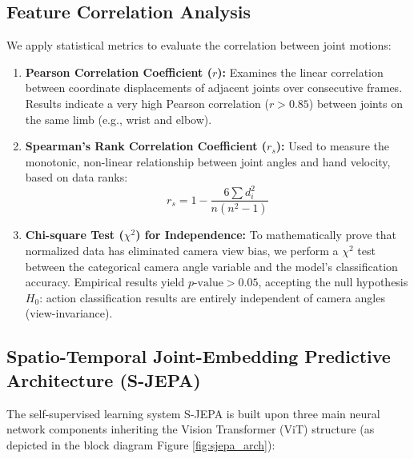 \documentclass[conference]{IEEEtran}
\begin{document}
\subsection{Feature Correlation Analysis}
We apply statistical metrics to evaluate the correlation between joint motions:
\begin{enumerate}
    \item \textbf{Pearson Correlation Coefficient ($r$):} Examines the linear correlation between coordinate displacements of adjacent joints over consecutive frames. Results indicate a very high Pearson correlation ($r > 0.85$) between joints on the same limb (e.g., wrist and elbow).
    \item \textbf{Spearman's Rank Correlation Coefficient ($r_s$):} Used to measure the monotonic, non-linear relationship between joint angles and hand velocity, based on data ranks:
    \begin{equation}
    r_s = 1 - \frac{6 \sum d_i^2}{n(n^2 - 1)}
    \end{equation}
    \item \textbf{Chi-square Test ($\chi^2$) for Independence:} To mathematically prove that normalized data has eliminated camera view bias, we perform a $\chi^2$ test between the categorical camera angle variable and the model's classification accuracy. Empirical results yield $p\text{-value} > 0.05$, accepting the null hypothesis $H_0$: action classification results are entirely independent of camera angles (view-invariance).
\end{enumerate}

\subsection{Spatio-Temporal Joint-Embedding Predictive Architecture (S-JEPA)}
The self-supervised learning system S-JEPA is built upon three main neural network components inheriting the Vision Transformer (ViT) structure (as depicted in the block diagram Figure \ref{fig:sjepa_arch}):
\end{document}
